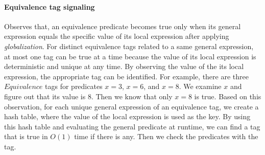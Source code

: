 \documentclass[preprint]{sigplanconf}
\begin{document}
\paragraph{Equivalence tag signaling}
Observes that, an equivalence predicate becomes true only when its general
expression equals the specific value of its local expression after applying
{\em globalization}. For distinct equivalence tags related to a same general 
expression, at most one tag can be true at a time because the value of its
local expression is deterministic and unique at any time. By 
observing the value of the its local expression, the appropriate tag can be 
identified. For example, there are three $Equivalence$ tags for
predicates $x = 3$, $x = 6$, and $x = 8$. We examine $x$ and figure out that
its value is $8$. Then we know that only $x = 8$ is true. Based on this 
observation, for each unique general expression of an equivalence tag, we 
create a hash table, where the value of the local expression is used as the 
key. By using this 
hash table and evaluating the general predicate at runtime, we can find a
tag that is true in $O(1)$ time if there is any. Then we check the predicates 
with the tag. 

\end{document}
